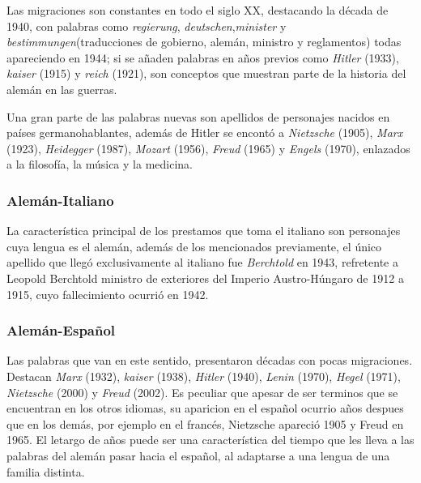 
Las migraciones son constantes en todo el siglo XX, destacando la década de 1940, con palabras como \textit{regierung}, \textit{deutschen},\textit{minister} y  \textit{bestimmungen}(traducciones de gobierno, alemán, ministro y reglamentos) todas apareciendo en 1944;  si se añaden palabras en años previos como \textit{Hitler} (1933), \textit{kaiser} (1915) y \textit{reich} (1921), son conceptos que muestran parte de la historia del alemán en las guerras. 

Una gran parte de las palabras nuevas son apellidos de  personajes nacidos en países germanohablantes,  además de Hitler se encontó a \textit{Nietzsche} (1905),  \textit{Marx} (1923), \textit{Heidegger} (1987),  \textit{Mozart} (1956), \textit{Freud} (1965) y \textit{Engels} (1970), enlazados a la filosofía, la música y la medicina. 


\subsubsection*{Alemán-Italiano}%

La característica principal de los prestamos que toma el italiano son personajes cuya lengua es el alemán,  además de los mencionados previamente, el único apellido que llegó exclusivamente al italiano fue \textit{Berchtold} en 1943, refretente a Leopold Berchtold ministro de exteriores del Imperio Austro-Húngaro de 1912 a 1915, cuyo fallecimiento ocurrió en 1942.


  
\subsubsection*{Alemán-Español}%

Las palabras que van en este sentido,  presentaron  décadas  con pocas migraciones. Destacan  \textit{Marx} (1932), \textit{kaiser} (1938), \textit{Hitler} (1940), \textit{Lenin} (1970), \textit{Hegel} (1971),  \textit{Nietzsche} (2000) y \textit{Freud} (2002).  Es peculiar que apesar de ser terminos que se encuentran en los otros idiomas, su aparicion en el español ocurrio  años despues que en los demás, por ejemplo en el francés,  Nietzsche apareció 1905 y Freud en 1965. El letargo de años puede ser una característica del tiempo que les lleva  a las  palabras del alemán pasar hacia el español, al adaptarse a una lengua de una familia distinta.





